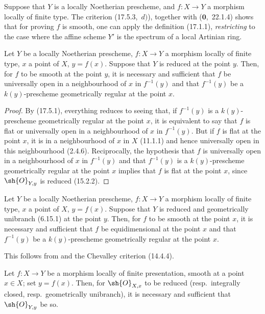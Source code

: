 \begin{remark}[17.5.4]
\label{IV.17.5.4}
Suppose that $Y$ is a locally Noetherian prescheme, and $f:X\to Y$ a morphism locally of finite type.
The criterion (17.5.3,~$d)$), together with ($\mathbf{0}$,~22.1.4) shows that for proving $f$ is smooth, one can apply the definition (17.1.1), \emph{restricting} to the case where the affine scheme $Y'$ is the spectrum of a local Artinian ring.
\end{remark}

\begin{proposition}[17.5.5]
\label{IV.17.5.5}
Let $Y$ be a locally Noetherian prescheme, $f:X\to Y$ a morphism locally of finite type, $x$ a point of $X$, $y=f(x)$.
Suppose that $Y$ is reduced at the point $y$.
Then, for $f$ to be smooth at the point $y$, it is necessary and sufficient that $f$ be universally open in a neighbourhood of $x$ in $f^{-1}(y)$ and that $f^{-1}(y)$ be a $k(y)$-prescheme geometrically regular at the point $x$.
\end{proposition}

\begin{proof}
By (17.5.1), everything reduces to seeing that, if $f^{-1}(y)$ is a $k(y)$-prescheme geometrically regular at the point $x$, it is equivalent to say that $f$ is flat or universally open in a neighbourhood of $x$ in $f^{-1}(y)$.
But if $f$ is flat at the point $x$, it is in a neighbourhood of $x$ in $X$ (11.1.1) and hence universally open in this neighbourhood (2.4.6).
Reciprocally, the hypothesis that $f$ is universally open in a neighbourhood of $x$ in $f^{-1}(y)$ and that $f^{-1}(y)$ is a $k(y)$-prescheme geometrically regular at the point $x$ implies that $f$ is flat at the point $x$, since $\sh{O}_{Y,y}$ is reduced (15.2.2).
\end{proof}

\begin{corollary}[17.5.6]
\label{IV.17.5.6}
Let $Y$ be a locally Noetherian prescheme, $f:X\to Y$ a morphism locally of finite type, $x$ a point of $X$, $y=f(x)$.
Suppose that $Y$ is reduced and geometrically unibranch (6.15.1) at the point $y$.
Then, for $f$ to be smooth at the point $x$, it is necessary and sufficient that $f$ be equidimensional at the point $x$ and that $f^{-1}(y)$ be a $k(y)$-prescheme geometrically regular at the point $x$.
\end{corollary}

This follows from  and the Chevalley criterion (14.4.4).

\begin{proposition}[17.5.7]
\label{IV.17.5.7}
Let $f:X\to Y$ be a morphism locally of finite presentation, smooth at a point $x\in X$; set $y=f(x)$.
Then, for $\sh{O}_{X,x}$ to be reduced (resp.\ integrally closed, resp.\ geometrically unibranch), it is necessary and sufficient that $\sh{O}_{Y,y}$ be so.
\end{proposition}

